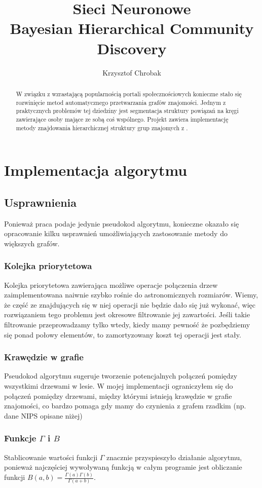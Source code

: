 \documentclass{article}
\author{Krzysztof Chrobak}
\title{Sieci Neuronowe \\ \small{Bayesian Hierarchical Community Discovery}}
\begin{document}
\maketitle

\begin{abstract}
W związku z wzrastającą popularnością portali społecznościowych konieczne stało
się rozwinięcie metod automatycznego przetwarzania grafów znajomości. Jednym z
praktycznych problemów tej dziedziny jest segmentacja struktury powiązań na
kręgi zawierające osoby mające ze sobą coś wspólnego. Projekt zawiera implementację
metody znajdowania hierarchicznej struktury grup znajomych z \cite{BHCD}.
\end{abstract}

\section{Implementacja algorytmu}
\subsection{Usprawnienia}
Ponieważ praca \cite{BHCD} podaje jedynie pseudokod algorytmu, konieczne
okazało się opracowanie kilku usprawnień umożliwiających zastosowanie metody do
większych grafów.

\subsubsection{Kolejka priorytetowa}
Kolejka priorytetowa zawierająca możliwe operacje połączenia drzew zaimplementowana
naiwnie szybko rośnie do astronomicznych rozmiarów. Wiemy, że część ze znajdujących
się w niej operacji nie będzie dało się już wykonać, więc rozwiązaniem tego
problemu jest okresowe filtrowanie jej zawartości. Jeśli takie filtrowanie
przeprowadzamy tylko wtedy, kiedy mamy pewność że pozbędziemy się ponad połowy
elementów, to zamortyzowany koszt tej operacji jest stały.

\subsubsection{Krawędzie w grafie}
Pseudokod algorytmu sugeruje tworzenie potencjalnych połączeń pomiędzy wszystkimi 
drzewami w lesie. W mojej implementacji ograniczyłem się do połączeń pomiędzy
drzewami, między którymi istnieją krawędzie w grafie znajomości, co bardzo pomaga
gdy mamy do czynienia z grafem rzadkim (np. dane NIPS opisane niżej)

\subsubsection{Funkcje $\Gamma$ i $B$}
Stablicowanie wartości funkcji $\Gamma$ znacznie przyspieszyło działanie algorytmu,
ponieważ najczęściej wywoływaną funkcją w całym programie jest obliczanie funkcji
$B(a, b) = \frac{\Gamma(a)\Gamma(b)}{\Gamma(a+b)}$.
\end{document}
